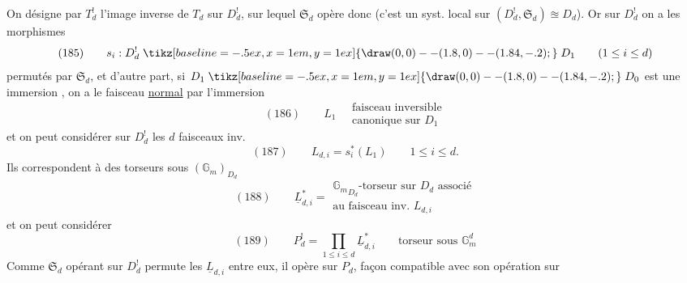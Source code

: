 On désigne par $T^!_d$ l'image inverse de $T_d$ sur $D^!_d$, sur lequel $\mathfrak S_d$ opère donc (c'est un  syst. local sur $(D^!_d,\mathfrak S_d)\approxeq D_d$). Or sur $D^!_d$ on a les  morphismes
\[
(185)\qquad s_i:D^!_d\mathrel{\tikz[baseline=-.5ex,x=1em,y=1ex]{\draw (0,0)--(1.8,0)--(1.84,-.2);}}D_1\qquad(1\leq i\leq d)
\]
permutés par $\mathfrak S_d$, et d'autre part, si $D_1\mathrel{\tikz[baseline=-.5ex,x=1em,y=1ex]{\draw (0,0)--(1.8,0)--(1.84,-.2);}}D_0$ est une immersion  , on a  le faisceau \uline{normal} par l'immersion
\[
(186)\qquad L_1\quad\begin{gathered}\text{faisceau inversible}\\\text{canonique sur }D_1\end{gathered}
\]
et on peut considérer sur $D^!_d$ les $d$ faisceaux inv.
\[
(187)\qquad L_{d,i}=s_i^*(L_1)\qquad1\leq i\leq d.
\]
Ils correspondent à des torseurs sous $(\mathbb G_m)_{D_d}$
\[
(188)\qquad\underline L_{d,i}^*=\begin{gathered}{\mathbb G_m}_{D_d}\text{-torseur sur }D_d\text{ associé}\\\text{au faisceau inv. }L_{d,i}\end{gathered}
\]
et on peut considérer
\[
(189)\qquad P^!_d=\prod_{1\leq i\leq d}\underline L_{d,i}^*\qquad\text{torseur sous }\mathbb G_m^d
\]
Comme $\mathfrak S_d$ opérant sur $D^!_d$ permute les  $\underline L_{d,i}$ entre eux, il opère sur $P_d$,    façon compatible avec son opération sur

